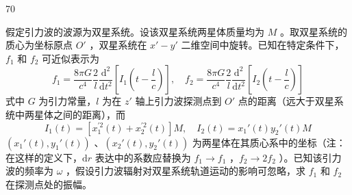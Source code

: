 \begin{problem}[33届物理竞赛决赛]{70}
\begin{subproblem}
\begin{subsubproblem}
        \end{subsubproblem}
    \end{subproblem}
    \begin{subproblem}
        假定引力波的波源为双星系统。设该双星系统两星体质量均为 $M$ 。取双星系统的质心为坐标原点 $O'$ ，双星系统在 $x'-y'$ 二维空间中旋转。已知在特定条件下，$f_{1}$ 和 $f_{2}$ 可近似表示为
        \begin{equation*}
            f_{1} = \frac{8\pi G}{c^{4}} \frac{2}{l} \frac{\mathrm{d}^{2}}{\mathrm{d}t^{2}} \left[ I_{1}(t - \frac{l}{c}) \right],\quad f_{2} = \frac{8\pi G}{c^{4}} \frac{2}{l} \frac{\mathrm{d}^{2}}{\mathrm{d}t^{2}} \left[ I_{2}(t - \frac{l}{c}) \right]
        \end{equation*}
        式中 $G$ 为引力常量，$l$ 为在 $z'$ 轴上引力波探测点到 $O'$ 点的距离（远大于双星系统中两星体之间的距离），而
        \begin{equation*}
            I_{1}(t) = [x_{1}^{\prime 2}(t) + x_{2}^{\prime 2}(t)] M,\quad I_{2}(t) = x_{1}'(t) y_{2}'(t) M
        \end{equation*}
        $(x_{1}'(t), y_{1}'(t))$ 、$(x_{2}'(t), y_{2}'(t))$ 为两星体在其质心系中的坐标（注：在这样的定义下，$\mathrm{d}r$ 表达中的系数应替换为 $f_{1} \to f_{1}$ ，$f_{2} \to 2f_{2}$ ）。已知该引力波的频率为 $\omega$ ，假设引力波辐射对双星系统轨道运动的影响可忽略，求 $f_{1}$ 和 $f_{2}$ 在探测点处的振幅。
    \end{subproblem}
\end{problem}